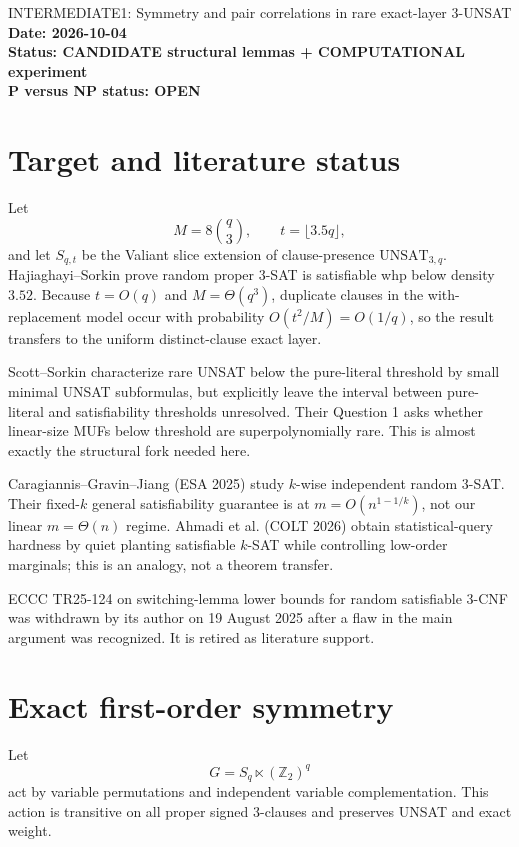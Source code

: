 \documentclass[11pt]{article}
\begin{document}
\begin{center}
{\Large INTERMEDIATE1: Symmetry and pair correlations in rare exact-layer 3-UNSAT}\\[4pt]
\textbf{Date: 2026-10-04}\\
\textbf{Status: CANDIDATE structural lemmas + COMPUTATIONAL experiment}\\
\textbf{P versus NP status: OPEN}
\end{center}

\section{Target and literature status}
Let
\[
M=8\binom q3,\qquad t=\lfloor3.5q\rfloor,
\]
and let \(S_{q,t}\) be the Valiant slice extension of clause-presence
\(\mathrm{UNSAT}_{3,q}\). Hajiaghayi--Sorkin prove random proper 3-SAT is
satisfiable whp below density \(3.52\). Because \(t=O(q)\) and
\(M=\Theta(q^3)\), duplicate clauses in the with-replacement model occur with
probability \(O(t^2/M)=O(1/q)\), so the result transfers to the uniform
distinct-clause exact layer.

Scott--Sorkin characterize rare UNSAT below the pure-literal threshold by
small minimal UNSAT subformulas, but explicitly leave the interval between
pure-literal and satisfiability thresholds unresolved. Their Question 1 asks
whether linear-size MUFs below threshold are superpolynomially rare. This is
almost exactly the structural fork needed here.

Caragiannis--Gravin--Jiang (ESA 2025) study \(k\)-wise independent random
3-SAT. Their fixed-\(k\) general satisfiability guarantee is at
\(m=O(n^{1-1/k})\), not our linear \(m=\Theta(n)\) regime. Ahmadi et al.
(COLT 2026) obtain statistical-query hardness by quiet planting satisfiable
\(k\)-SAT while controlling low-order marginals; this is an analogy, not a
theorem transfer.

ECCC TR25-124 on switching-lemma lower bounds for random satisfiable 3-CNF
was withdrawn by its author on 19 August 2025 after a flaw in the main
argument was recognized. It is retired as literature support.

\section{Exact first-order symmetry}
Let
\[
G=S_q\ltimes(\mathbb Z_2)^q
\]
act by variable permutations and independent variable complementation. This
action is transitive on all proper signed 3-clauses and preserves UNSAT and
exact weight.
\end{document}
